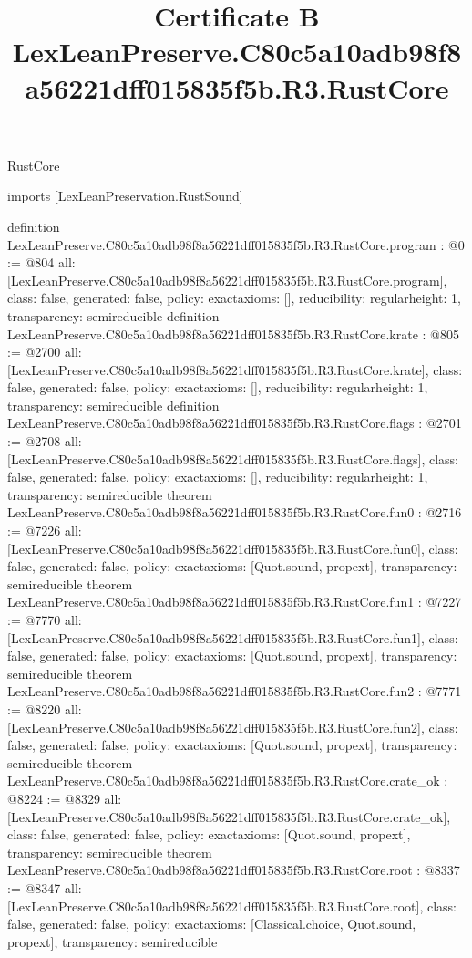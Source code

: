 \begin{lexlean}{RustCore}
\title{Certificate B LexLeanPreserve.C80c5a10adb98f8a56221dff015835f5b.R3.RustCore}
\begin{coremodule}
imports [LexLeanPreservation.RustSound]

definition LexLeanPreserve.C80c5a10adb98f8a56221dff015835f5b.R3.RustCore.program : @0 := @804 {
  all: [LexLeanPreserve.C80c5a10adb98f8a56221dff015835f5b.R3.RustCore.program],
  class: false,
  generated: false,
  policy: exact{axioms: []},
  reducibility: regular{height: 1},
  transparency: semireducible
}
definition LexLeanPreserve.C80c5a10adb98f8a56221dff015835f5b.R3.RustCore.krate : @805 := @2700 {
  all: [LexLeanPreserve.C80c5a10adb98f8a56221dff015835f5b.R3.RustCore.krate],
  class: false,
  generated: false,
  policy: exact{axioms: []},
  reducibility: regular{height: 1},
  transparency: semireducible
}
definition LexLeanPreserve.C80c5a10adb98f8a56221dff015835f5b.R3.RustCore.flags : @2701 := @2708 {
  all: [LexLeanPreserve.C80c5a10adb98f8a56221dff015835f5b.R3.RustCore.flags],
  class: false,
  generated: false,
  policy: exact{axioms: []},
  reducibility: regular{height: 1},
  transparency: semireducible
}
theorem LexLeanPreserve.C80c5a10adb98f8a56221dff015835f5b.R3.RustCore.fun0 : @2716 := @7226 {
  all: [LexLeanPreserve.C80c5a10adb98f8a56221dff015835f5b.R3.RustCore.fun0],
  class: false,
  generated: false,
  policy: exact{axioms: [Quot.sound, propext]},
  transparency: semireducible
}
theorem LexLeanPreserve.C80c5a10adb98f8a56221dff015835f5b.R3.RustCore.fun1 : @7227 := @7770 {
  all: [LexLeanPreserve.C80c5a10adb98f8a56221dff015835f5b.R3.RustCore.fun1],
  class: false,
  generated: false,
  policy: exact{axioms: [Quot.sound, propext]},
  transparency: semireducible
}
theorem LexLeanPreserve.C80c5a10adb98f8a56221dff015835f5b.R3.RustCore.fun2 : @7771 := @8220 {
  all: [LexLeanPreserve.C80c5a10adb98f8a56221dff015835f5b.R3.RustCore.fun2],
  class: false,
  generated: false,
  policy: exact{axioms: [Quot.sound, propext]},
  transparency: semireducible
}
theorem LexLeanPreserve.C80c5a10adb98f8a56221dff015835f5b.R3.RustCore.crate_ok : @8224 := @8329 {
  all: [LexLeanPreserve.C80c5a10adb98f8a56221dff015835f5b.R3.RustCore.crate_ok],
  class: false,
  generated: false,
  policy: exact{axioms: [Quot.sound, propext]},
  transparency: semireducible
}
theorem LexLeanPreserve.C80c5a10adb98f8a56221dff015835f5b.R3.RustCore.root : @8337 := @8347 {
  all: [LexLeanPreserve.C80c5a10adb98f8a56221dff015835f5b.R3.RustCore.root],
  class: false,
  generated: false,
  policy: exact{axioms: [Classical.choice, Quot.sound, propext]},
  transparency: semireducible
}


\end{coremodule}
\end{lexlean}
